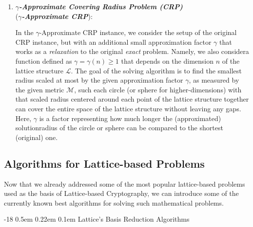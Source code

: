 \documentclass[runningheads]{llncs}
\makeatletter
\renewcommand\subsubsection{\@startsection{subsubsection}{3}{\z@}%
                       {-18\p@ \@plus -4\p@ \@minus -4\p@}%
                       {0.5em \@plus 0.22em \@minus 0.1em}%
                       {\normalfont\normalsize\bfseries\boldmath}}
\numberwithin{equation}{section}
\makeatother
\begin{document}
\begin{enumerate}
        \item \textbf{\textit{$\gamma$-Approximate Covering Radius Problem (CRP)}}\\ (\textbf{\textit{$\gamma$-Approximate CRP}}):
        \vspace{0.6ex}

        In the $\gamma$-Approximate CRP instance, we consider the setup of the original CRP instance, but with an additional small approximation factor $\gamma$ that works as a \textit{relaxation} to the original \textit{exact} problem. Namely, we also consider\break a function defined as $\gamma = \gamma(n) \geq 1$ that depends on the dimension $n$ of the lattice structure $\mathcal{L}$. The goal of the solving algorithm is to find the smallest radius scaled at most by the given approximation factor $\gamma$, as measured by the given metric $\mathcal{M}$, such each circle (or sphere for higher-dimensions) with that scaled radius centered around each point of the lattice structure together can cover the entire space of the lattice structure without leaving any gaps. Here, $\gamma$ is a factor representing how much longer the (approximated) solution\break radius of the circle or sphere can be compared to the shortest (original) one.
        
    \end{enumerate}
    
    \subsection{Algorithms for Lattice-based Problems}
    \label{subsec:algorithms-for-lattice-based-problems}

    Now that we already addressed some of the most popular lattice-based problems used as the basis of Lattice-based Cryptography, we can introduce some of the currently known best algorithms for solving such mathematical problems.

    \subsubsection{Lattice's Basis Reduction Algorithms}
    \label{subsubsec:lattice-basis-reduction-algorithms}
\end{document}
